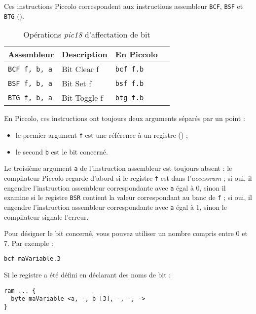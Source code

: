 
Ces instructions Piccolo correspondent aux instructions assembleur \texttt{BCF}, \texttt{BSF} et \texttt{BTG} ().

\begin{table}[!ht]
  \centering
  \small
  \begin{tabular}{llll}
    \textbf{Assembleur} & \textbf{Description} & \textbf{En Piccolo}\\
    \hline
    \texttt{BCF f, b, a} & Bit Clear f & \texttt{bcf f.b} \\
    \texttt{BSF f, b, a} & Bit Set f & \texttt{bsf f.b} \\
    \texttt{BTG f, b, a} & Bit Toggle f & \texttt{btg f.b} \\
  \hline
  \end{tabular}
  \caption{Opérations \emph{pic18} d'affectation de bit}
\end{table}

En Piccolo, ces instructions ont toujours deux arguments séparés par un point :
\begin{itemize}
  \item le premier argument \texttt{f} est une référence à un registre () ;
  \item le second \texttt{b} est le bit concerné.
\end{itemize}

Le troisième argument \texttt{a} de l'instruction assembleur est toujours absent : le compilateur Piccolo regarde d'abord si le registre \texttt{f} est dans l'\emph{accessram} ; si oui, il engendre l'instruction assembleur correspondante avec \texttt{a} égal à 0, sinon il examine si le registre \texttt{BSR} contient la valeur correspondant au banc de \texttt{f} ; si oui, il engendre l'instruction assembleur correspondante avec \texttt{a} égal à 1, sinon le compilateur signale l'erreur.

Pour désigner le bit concerné, vous pouvez utiliser un nombre compris entre 0 et 7. Par exemple :
\begin{lstlisting}[language=piccolo]
bcf maVariable.3
\end{lstlisting}

Si le registre a été défini en déclarant des noms de bit :
\begin{lstlisting}[language=piccolo]
ram ... {
  byte maVariable <a, -, b [3], -, -, ->
}
\end{lstlisting}

